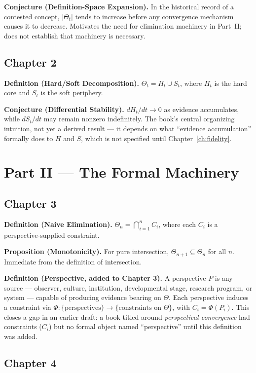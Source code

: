 \textbf{Conjecture (Definition-Space Expansion).} In the historical record of a contested concept, $|\Theta_t|$ tends to increase before any convergence mechanism causes it to decrease. Motivates the need for elimination machinery in Part~II; does not establish that machinery is necessary.

\subsection*{Chapter 2}

\textbf{Definition (Hard/Soft Decomposition).} $\Theta_t = H_t \cup S_t$, where $H_t$ is the hard core and $S_t$ is the soft periphery.

\textbf{Conjecture (Differential Stability).} $dH_t/dt \to 0$ as evidence accumulates, while $dS_t/dt$ may remain nonzero indefinitely. The book's central organizing intuition, not yet a derived result --- it depends on what ``evidence accumulation'' formally does to $H$ and $S$, which is not specified until Chapter~\ref{ch:fidelity}.

\section*{Part II --- The Formal Machinery}

\subsection*{Chapter 3}

\textbf{Definition (Naive Elimination).} $\Theta_n = \bigcap_{i=1}^n C_i$, where each $C_i$ is a perspective-supplied constraint.

\textbf{Proposition (Monotonicity).} For pure intersection, $\Theta_{n+1} \subseteq \Theta_n$ for all $n$. Immediate from the definition of intersection.

\textbf{Definition (Perspective, added to Chapter 3).} A perspective $P$ is any source --- observer, culture, institution, developmental stage, research program, or system --- capable of producing evidence bearing on $\Theta$. Each perspective induces a constraint via $\Phi : \{\text{perspectives}\} \to \{\text{constraints on } \Theta\}$, with $C_i = \Phi(P_i)$. This closes a gap in an earlier draft: a book titled around \emph{perspectival convergence} had constraints ($C_i$) but no formal object named ``perspective'' until this definition was added.

\subsection*{Chapter 4}

